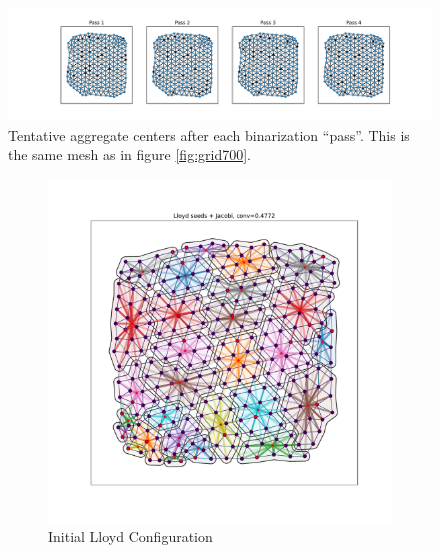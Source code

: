 \documentclass{article}
\begin{document}
\begin{figure}[h]
  \centering
  \includegraphics[width=\textwidth, trim=120 0 100 0, clip]{grid_700_agg_pass.pdf}
  \caption{Tentative aggregate centers after each binarization ``pass''.  This is the same mesh as in figure \ref{fig:grid700}.}
\end{figure}

\begin{figure}[h]
  \centering
  \begin{subfigure}[t]{0.32\textwidth}
    \centering
    \includegraphics[width=\textwidth, trim=80 70 70 50, clip]{grid_800_dumb.pdf}
    \caption{Initial Lloyd Configuration}
  \end{subfigure}
  \begin{subfigure}[t]{0.32\textwidth}
    \centering

\end{subfigure}
\end{figure}
\end{document}
